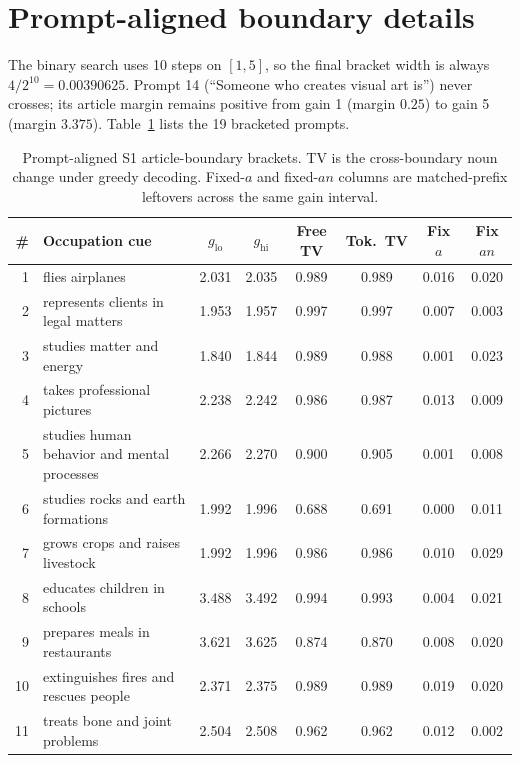 \section{Prompt-aligned boundary details}
\label{app:boundary}

The binary search uses 10 steps on \([1,5]\), so the final bracket width is
always \(4/2^{10}=0.00390625\). Prompt 14 (``Someone who creates visual art
is'') never crosses; its article margin remains positive from gain 1
(margin \(0.25\)) to gain 5 (margin \(3.375\)). Table~\ref{tbl-boundary}
lists the 19 bracketed prompts.

\begin{table}[h]
\centering
\caption{Prompt-aligned S1 article-boundary brackets. TV is the
cross-boundary noun change under greedy decoding. Fixed-\(a\) and
fixed-\(an\) columns are matched-prefix leftovers across the same gain
interval.}
\label{tbl-boundary}
\scriptsize
\setlength{\tabcolsep}{3pt}
\begin{tabular}{rlcccccc}
\toprule
\# & Occupation cue & \(g_{\mathrm{lo}}\) & \(g_{\mathrm{hi}}\) & Free TV & Tok.\ TV & Fix \(a\) & Fix \(an\) \\
\midrule
1 & flies airplanes & 2.031 & 2.035 & 0.989 & 0.989 & 0.016 & 0.020 \\
2 & represents clients in legal matters & 1.953 & 1.957 & 0.997 & 0.997 & 0.007 & 0.003 \\
3 & studies matter and energy & 1.840 & 1.844 & 0.989 & 0.988 & 0.001 & 0.023 \\
4 & takes professional pictures & 2.238 & 2.242 & 0.986 & 0.987 & 0.013 & 0.009 \\
5 & studies human behavior and mental processes & 2.266 & 2.270 & 0.900 & 0.905 & 0.001 & 0.008 \\
6 & studies rocks and earth formations & 1.992 & 1.996 & 0.688 & 0.691 & 0.000 & 0.011 \\
7 & grows crops and raises livestock & 1.992 & 1.996 & 0.986 & 0.986 & 0.010 & 0.029 \\
8 & educates children in schools & 3.488 & 3.492 & 0.994 & 0.993 & 0.004 & 0.021 \\
9 & prepares meals in restaurants & 3.621 & 3.625 & 0.874 & 0.870 & 0.008 & 0.020 \\
10 & extinguishes fires and rescues people & 2.371 & 2.375 & 0.989 & 0.989 & 0.019 & 0.020 \\
11 & treats bone and joint problems & 2.504 & 2.508 & 0.962 & 0.962 & 0.012 & 0.002 \\

\end{tabular}
\end{table}

